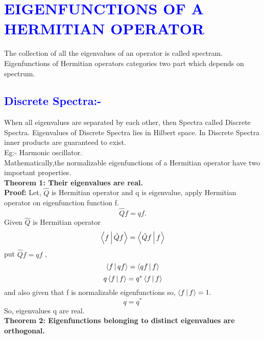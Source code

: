 \chapter{\textcolor{blue}{ EIGENFUNCTIONS OF A HERMITIAN OPERATOR}}
The collection of all the eigenvalues of an operator is called spectram. Eigenfunctions of Hermitian operators categories two part which depends on spectrum.
\section{\textcolor{blue}{Discrete Spectra:-}}
\hspace*{4cm}When all eigenvalues are separated by each other, then Spectra called  Discrete Spectra. Eigenvalues of Discrete Spectra lies in Hilbert space. In Discrete Spectra inner products are guaranteed to exist.\\
Eg:- Harmonic oscillator.\\
\vspace*{2cm} Mathematically,the normalizable eigenfunctions of a Hermitian operator have two important properties.\\
\textbf{Theorem 1: Their eigenvalues are real.}\\

\textbf{Proof:} Let, $\hat{Q}$ is Hermitian operator and q is eigenvalue, apply Hermitian operator on eigenfunction function f.\\
$$\hat{Q}f=qf.$$
Given $\hat{Q}$ is Hermitian operator$$\Braket{f|\hat{Q}f}=\Braket{\hat{Q}f|f}$$
put $\hat{Q}f=qf$ ,$$\Braket{f|qf}=\Braket{qf|f}$$
$$q\Braket{f|f}={q}^{*}\Braket{f|f}$$
and also given that f is normalizable eigenfunctions so, $\Braket{f|f}=1.$
$$q=q^{*}$$
So, eigenvalues q are real.\\
\textbf{Theorem 2: Eigenfunctions belonging to distinct eigenvalues are orthogonal.}\\

